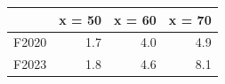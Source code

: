 \begin{tabular}{lrrr}
\toprule
 & x = 50 & x = 60 & x = 70 \\
\midrule
F2020 & 1.7 & 4.0 & 4.9 \\
F2023 & 1.8 & 4.6 & 8.1 \\
\bottomrule
\end{tabular}
